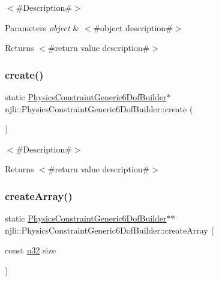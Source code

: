 $<$\#\+Description\#$>$


\begin{DoxyParams}{Parameters}
{\em object} & $<$\#object description\#$>$\\
\hline
\end{DoxyParams}
\begin{DoxyReturn}{Returns}
$<$\#return value description\#$>$ 
\end{DoxyReturn}
\mbox{\label{classnjli_1_1_physics_constraint_generic6_dof_builder_aaf3fe91011bb96d8b6dc0cfb79c23625}} 
\subsubsection{\texorpdfstring{create()}{create()}}
{\footnotesize\ttfamily static \mbox{\hyperlink{classnjli_1_1_physics_constraint_generic6_dof_builder}{Physics\+Constraint\+Generic6\+Dof\+Builder}}$\ast$ njli\+::\+Physics\+Constraint\+Generic6\+Dof\+Builder\+::create (\begin{DoxyParamCaption}{ }\end{DoxyParamCaption})\hspace{0.3cm}{\ttfamily [static]}}

$<$\#\+Description\#$>$

\begin{DoxyReturn}{Returns}
$<$\#return value description\#$>$ 
\end{DoxyReturn}
\mbox{\label{classnjli_1_1_physics_constraint_generic6_dof_builder_a7b06ac114aa1fbcc704133290fec5b3c}} 
\subsubsection{\texorpdfstring{create\+Array()}{createArray()}}
{\footnotesize\ttfamily static \mbox{\hyperlink{classnjli_1_1_physics_constraint_generic6_dof_builder}{Physics\+Constraint\+Generic6\+Dof\+Builder}}$\ast$$\ast$ njli\+::\+Physics\+Constraint\+Generic6\+Dof\+Builder\+::create\+Array (\begin{DoxyParamCaption}\item[{const \mbox{\hyperlink{_util_8h_a10e94b422ef0c20dcdec20d31a1f5049}{u32}}}]{size }\end{DoxyParamCaption})\hspace{0.3cm}{\ttfamily [static]}}


